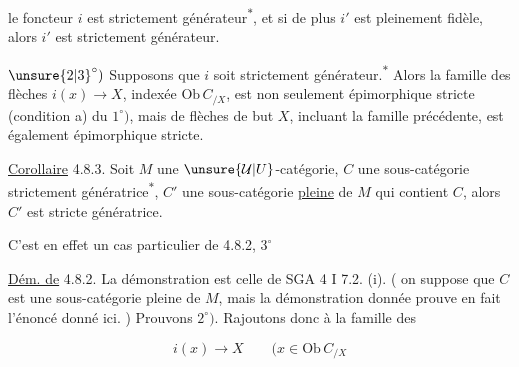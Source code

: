 

le foncteur $i$ est strictement générateur\textsuperscript{$*$}, et si de plus $i'$ est pleinement fidèle, alors $i'$ est strictement générateur.


$\unsure{2|3}^\circ)$ Supposons que $i$ soit strictement générateur.\textsuperscript{$*$} Alors  la famille des flèches $i(x)\longrightarrow X$, indexée  $\mathrm{Ob}\,C_{/X}$, est non seulement épimorphique stricte (condition a) du $1^\circ)$, mais    de flèches de but $X$, incluant la famille précédente, est également épimorphique stricte.



\uline{Corollaire} 4.8.3. Soit $M$ une $\unsure{\mathcal U|U}$-catégorie, $C$ une sous-catégorie strictement génératrice\textsuperscript{$*$}, $C'$ une sous-catégorie \uline{pleine} de $M$ qui contient $C$, alors $C'$ est stricte génératrice.


C'est en effet un cas particulier de 4.8.2, $3^\circ$

\uline{Dém. de} 4.8.2. La démonstration est  celle de SGA 4 I 7.2. (i). ( on suppose que $C$ est une sous-catégorie pleine de $M$, mais la démonstration donnée prouve en fait l'énoncé donné ici. ) Prouvons $2^\circ)$. Rajoutons donc à la famille des

\[ i(x)\longrightarrow X \qquad (x\in\mathrm{Ob}\,C_{/X} \]


